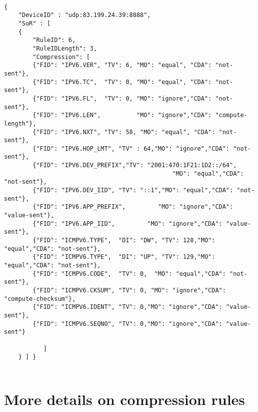 \begin{lstlisting}[basicstyle=\ttfamily\tiny, caption={rule 6/3 for ping traffic}, caption=ping-comp-rule, backgroundcolor=\color{yellow}]

{
    "DeviceID" : "udp:83.199.24.39:8888",
    "SoR" : [
	{
	    "RuleID": 6,
	    "RuleIDLength": 3,
	    "Compression": [
		{"FID": "IPV6.VER", "TV": 6, "MO": "equal", "CDA": "not-sent"},
		{"FID": "IPV6.TC",  "TV": 0, "MO": "equal", "CDA": "not-sent"},
		{"FID": "IPV6.FL",  "TV": 0, "MO": "ignore","CDA": "not-sent"},
		{"FID": "IPV6.LEN",          "MO": "ignore","CDA": "compute-length"},
		{"FID": "IPV6.NXT", "TV": 58, "MO": "equal", "CDA": "not-sent"},
		{"FID": "IPV6.HOP_LMT", "TV" : 64,"MO": "ignore","CDA": "not-sent"},
		{"FID": "IPV6.DEV_PREFIX","TV": "2001:470:1F21:1D2::/64",
                                               "MO": "equal","CDA": "not-sent"},
		{"FID": "IPV6.DEV_IID", "TV": "::1","MO": "equal","CDA": "not-sent"},
		{"FID": "IPV6.APP_PREFIX",         "MO": "ignore","CDA": "value-sent"},
		{"FID": "IPV6.APP_IID",         "MO": "ignore","CDA": "value-sent"},
		{"FID": "ICMPV6.TYPE",  "DI": "DW", "TV": 128,"MO": "equal","CDA": "not-sent"},
		{"FID": "ICMPV6.TYPE",  "DI": "UP", "TV": 129,"MO": "equal","CDA": "not-sent"},
		{"FID": "ICMPV6.CODE",  "TV": 0,  "MO": "equal","CDA": "not-sent"},
		{"FID": "ICMPV6.CKSUM", "TV": 0, "MO": "ignore","CDA": "compute-checksum"},
		{"FID": "ICMPV6.IDENT", "TV": 0,"MO": "ignore","CDA": "value-sent"},
		{"FID": "ICMPV6.SEQNO", "TV": 0,"MO": "ignore","CDA": "value-sent"}
		
	       ]
	} ] }
	
\end{lstlisting}



\section{More details on compression rules}

